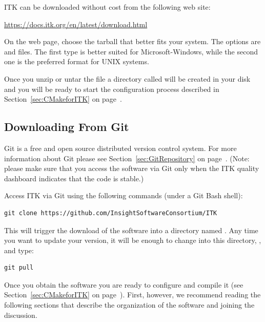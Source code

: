 ITK can be downloaded without cost from the following web site:
\begin{center}
  \url{https://docs.itk.org/en/latest/download.html}
\end{center}

On the web page, choose the tarball that better fits your system. The options are
 and  files. The first type is better suited for
Microsoft-Windows, while the second one is the preferred format for UNIX
systems.

Once you unzip or untar the file a directory called
 will be created in your disk and
you will be ready to start the configuration process described in
Section~\ref{sec:CMakeforITK} on page~\pageref{sec:CMakeforITK}.

\subsection{Downloading From Git}%
\label{sec:DownloadingFromGit}%

Git is a free and open source distributed version control system.  For more
information about Git please see Section~\ref{sec:GitRepository}
on page~\pageref{sec:GitRepository}. (Note: please make sure that you access the
software via Git only when the ITK quality dashboard indicates that the code
is stable.)

Access ITK via Git using the following commands (under a Git Bash shell):
\begin{verbatim}
git clone https://github.com/InsightSoftwareConsortium/ITK
\end{verbatim}

This will trigger the download of the software into a directory named
.  Any time you want to update your version, it will be enough to
change into this directory, , and type:
\begin{verbatim}
git pull
\end{verbatim}

Once you obtain the software you are ready to configure and compile it (see
Section~\ref{sec:CMakeforITK} on page~\pageref{sec:CMakeforITK}). First,
however, we recommend reading the following sections that describe the
organization of the software and joining the discussion.

